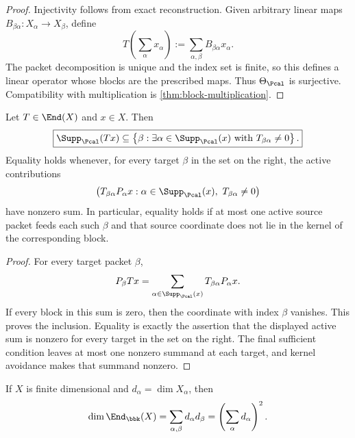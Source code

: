 \begin{proof}
Injectivity follows from exact reconstruction.  Given arbitrary linear maps $B_{\beta\alpha}:X_\alpha\to X_\beta$, define
\[
T\left(\sum_\alpha x_\alpha\right)
:=
\sum_{\alpha,\beta}B_{\beta\alpha}x_\alpha.
\]
The packet decomposition is unique and the index set is finite, so this defines a linear operator whose blocks are the prescribed maps.  Thus $\Theta_{\Pcal}$ is surjective.  Compatibility with multiplication is \cref{thm:block-multiplication}.
\end{proof}



\begin{corollary}
\label{cor:packet-support-propagation}
Let \(T\in\End(X)\) and \(x\in X\).  Then
\[
\boxed{
\Supp_{\Pcal}(Tx)
\subseteq
\left\{\beta:\exists\alpha\in\Supp_{\Pcal}(x)
\text{ with }T_{\beta\alpha}\neq0\right\}.
}
\]
Equality holds whenever, for every target \(\beta\) in the set on the right, the active contributions
\[
\bigl(T_{\beta\alpha}P_\alpha x:
\alpha\in\Supp_{\Pcal}(x),\ T_{\beta\alpha}\neq0\bigr)
\]
have nonzero sum.  In particular, equality holds if at most one active source packet feeds each such \(\beta\) and that source coordinate does not lie in the kernel of the corresponding block.
\end{corollary}

\begin{proof}
For every target packet \(\beta\),
\[
P_\beta Tx
=
\sum_{\alpha\in\Supp_{\Pcal}(x)}T_{\beta\alpha}P_\alpha x.
\]
If every block in this sum is zero, then the coordinate with index \(\beta\) vanishes.  This proves the inclusion.  Equality is exactly the assertion that the displayed active sum is nonzero for every target in the set on the right.  The final sufficient condition leaves at most one nonzero summand at each target, and kernel avoidance makes that summand nonzero.
\end{proof}


\begin{corollary}
\label{cor:dimension-count}
If $X$ is finite dimensional and $d_\alpha=\dim X_\alpha$, then
\[
\dim\End_{\bbk}(X)
=
\sum_{\alpha,\beta}d_\alpha d_\beta
=
\left(\sum_\alpha d_\alpha\right)^2.
\]
\end{corollary}

